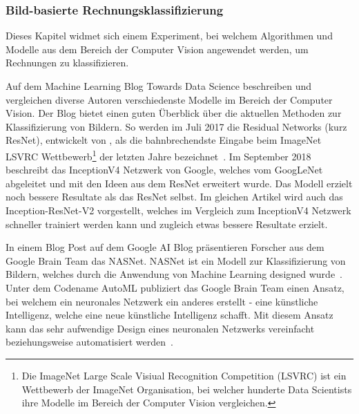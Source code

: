 \subsubsection{Bild-basierte Rechnungsklassifizierung}
\label{chap:image-recon}


Dieses Kapitel widmet sich einem Experiment, bei welchem Algorithmen und Modelle aus dem Bereich der Computer Vision angewendet werden, um Rechnungen zu klassifizieren.

Auf dem Machine Learning Blog Towards Data Science beschreiben und vergleichen diverse Autoren verschiedenste Modelle im Bereich der Computer Vision. Der Blog bietet einen guten Überblick über die aktuellen Methoden zur Klassifizierung von Bildern. So werden im Juli 2017 die Residual Networks (kurz ResNet), entwickelt von \textcite{He2015}, als die bahnbrechendste Eingabe beim ImageNet LSVRC Wettbewerb\footnote{Die ImageNet Large Scale Visiual Recognition Competition (LSVRC) ist ein Wettbewerb der ImageNet Organisation, bei welcher hunderte Data Scientists ihre Modelle im Bereich der Computer Vision vergleichen.} der letzten Jahre bezeichnet~\autocite{Fungg2017ResNet}. Im September 2018 beschreibt \textcite{SHTsuang2018Inception} das InceptionV4 Netzwerk von Google, welches vom GoogLeNet abgeleitet und mit den Ideen aus dem ResNet erweitert wurde. Das Modell erzielt noch bessere Resultate als das ResNet selbst. Im gleichen Artikel wird auch das Inception-ResNet-V2 vorgestellt, welches im Vergleich zum InceptionV4 Netzwerk schneller trainiert werden kann und zugleich etwas bessere Resultate erzielt. 

In einem Blog Post auf dem Google AI Blog präsentieren Forscher aus dem Google Brain Team das NASNet. NASNet ist ein Modell zur Klassifizierung von Bildern, welches durch die Anwendung von Machine Learning designed wurde~\autocite{GoogleNasNet}. Unter dem Codename AutoML publiziert das Google Brain Team einen Ansatz, bei welchem ein neuronales Netzwerk ein anderes erstellt - eine künstliche Intelligenz, welche eine neue künstliche Intelligenz schafft. Mit diesem Ansatz kann das sehr aufwendige Design eines neuronalen Netzwerks vereinfacht beziehungsweise automatisiert werden~\autocite{GoogleAutoML}.


